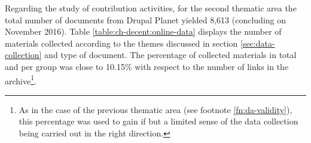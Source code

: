 Regarding the study of contribution activities, for the second thematic area the total number of documents from Drupal Planet yielded 8,613 (concluding on  November 2016). Table \ref{table:ch-decent:online-data} displays the number of materials collected according to the themes discussed in section \ref{sec:data-collection} and type of document. The percentage of collected materials in total and per group was close to 10.15\% with respect to the number of links in the archive\footnote{As in the case of the previous thematic area (see footnote \ref{fn:da-validity}), this percentage was used to gain if but a limited sense of the data collection being carried out in the right direction.}.


    \begin{table}[h]
    \caption[Summary of materials collected for documentary analysis for the second thematic area]%
    {Summary of materials collected for documentary analysis for the second thematic area, grouped by type of document and theme.}
    \label{table:ch-decent:online-data}
    \end{table}
    
